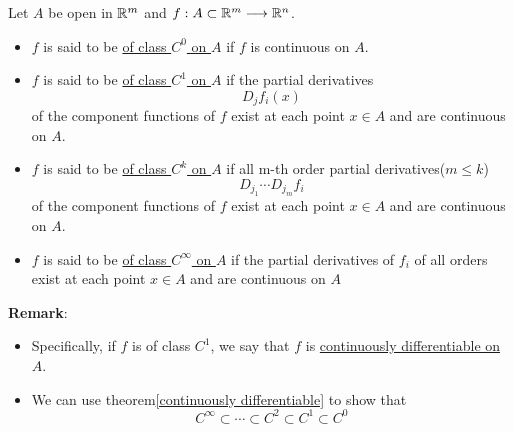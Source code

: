 \begin{definition}
    Let $A$ be open in $\mathbb{R}^m$ and $f:A\subset \mathbb{R}^m \longrightarrow \mathbb{R}^n$.
    \begin{itemize}
        \item $f$ is said to be \underline{of class $C^0$ on $A$}
        if $f$ is continuous on $A$.
        \item $f$ is said to be \underline{of class $C^1$ on $A$}
        if the partial derivatives $$D_jf_i(x)$$ of the component functions of $f$ exist at each point $x\in A$ and are continuous on $A$.
        \item $f$ is said to be \underline{of class $C^k$ on $A$}
        if all m-th order partial derivatives($m\leq k$) $$D_{j_1}\cdots D_{j_m}f_i$$ of the component functions of $f$ exist at each point $x\in A$ and are continuous on $A$.
        \item  $f$ is said to be \underline{of class $C^{\infty}$ on $A$} 
        if the partial derivatives of $f_i$ of all orders exist at each point $x\in A$ and are continuous on $A$
    \end{itemize}
\end{definition}
\noindent \textbf{Remark}:
\begin{itemize}
    \item Specifically, if $f$ is of class $C^1$, we say that $f$ is \underline{continuously differentiable on $A$}.
    \item We can use theorem\ref{continuously differentiable} to show that $$C^{\infty}\subset \cdots \subset C^2 \subset C^1 \subset C^0$$
\end{itemize}

